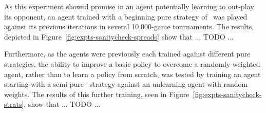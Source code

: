 

As this experiment showed promise in an agent potentially learning
to out-play its opponent,
an agent trained with a beginning pure strategy of \handmaxavg\ was played
against its previous iterations in several 10,000-game tournaments.
%
The results,
depicted in Figure~\ref{fig:expts-sanitycheck-spreads}
show that ... TODO ...



Furthermore,
as the agents were previously each trained against different pure strategies,
the ability to improve a basic policy to overcome a randomly-weighted agent,
rather than to learn a policy from scratch,
was tested by training an agent starting with a semi-pure
\handmaxavg\ strategy against an unlearning agent with random weights.
%
The results of this further training,
seen in Figure~\ref{fig:expts-sanitycheck-strats},
show that ... TODO ...



